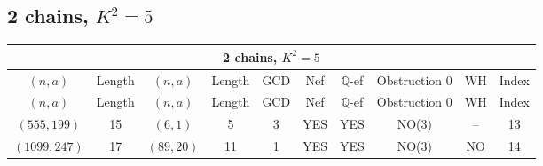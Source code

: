 \subsection{2 chains, $K^2 = 5$}
\begin{longtable}{|c|c|c|c|c|c|c|c|c|c|}
\hline
\multicolumn{10}{|c|}{2 chains, $K^2 = 5$}\\
\hline
$(n,a)$ & Length & $(n,a)$ & Length & GCD & Nef & $\mathbb Q$-ef & Obstruction 0 & WH & Index\\
\hline
\endfirsthead

\hline
$(n,a)$ & Length & $(n,a)$ & Length & GCD & Nef & $\mathbb Q$-ef & Obstruction 0 & WH & Index\\
\hline
\endhead
\hline
\endfoot

$(555, 199)$ & 15 & $(6, 1)$ & 5 & 3 & YES & YES & NO(3) & -- & 13\\
$(1099, 247)$ & 17 & $(89, 20)$ & 11 & 1 & YES & YES & NO(3) & NO & 14
\end{longtable}
